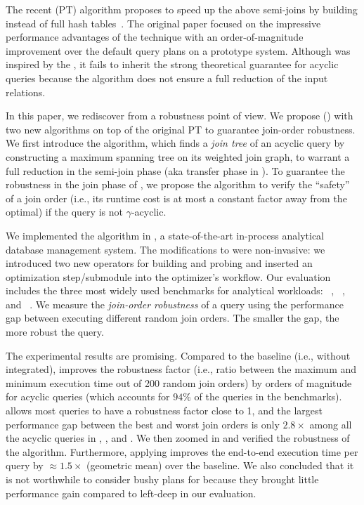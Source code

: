 The recent \PT (PT) algorithm proposes to speed up the above semi-joins by building \BFs instead of full hash tables~\cite{yang2023PT}. The original paper focused on the impressive performance advantages of the technique with an order-of-magnitude improvement over the default query plans on a prototype system. Although \PT was inspired by the \YannAlg, it fails to inherit the strong theoretical guarantee for acyclic queries because the algorithm does not ensure a full reduction of the input relations.

In this paper, we rediscover \PT from a robustness point of view. We propose \textbf{\RPT} (\rpt) with two new algorithms on top of the original PT to guarantee join-order robustness. We first introduce the \TreeStruct algorithm, which finds a \emph{join tree} of an acyclic query by constructing a maximum spanning tree on its weighted join graph, to warrant a full reduction in the semi-join phase (aka transfer phase in \rpt). To guarantee the robustness in the join phase of \rpt, we propose the \SafeSubJoin algorithm to verify the ``safety'' of a join order (i.e., its runtime cost is at most a constant factor away from the optimal) if the query is not $\gamma$-acyclic.

We implemented the \RPT algorithm in \duckdb, a state-of-the-art in-process analytical database management system. The modifications to \duckdb were non-invasive: we introduced two new operators for building and probing \BFs and inserted an \rpt optimization step/submodule into the optimizer's workflow. Our evaluation includes the three most widely used benchmarks for analytical workloads: \tpch~\cite{TPCH}, \job~\cite{JOB}, and \tpcds~\cite{TPCDS}. We measure the \emph{join-order robustness} of a query using the performance gap between executing different random join orders. The smaller the gap, the more robust the query.

The experimental results are promising. Compared to the baseline (i.e., \duckdb without \rpt integrated), \rpt improves the robustness factor (i.e., ratio between the maximum and minimum execution time out of 200 random join orders) by orders of magnitude for acyclic queries (which accounts for $94\%$ of the queries in the benchmarks). \rpt allows most queries to have a robustness factor close to 1, and the largest performance gap between the best and worst join orders is only $2.8\times$ among all the acyclic queries in \tpch, \job, and \tpcds. We then zoomed in and verified the robustness of the \TreeStruct algorithm. Furthermore, applying \rpt improves the end-to-end execution time per query by $\approx$$1.5\times$ (geometric mean) over the baseline. We also concluded that it is not worthwhile to consider bushy plans for \rpt because they brought little performance gain compared to left-deep in our evaluation.

